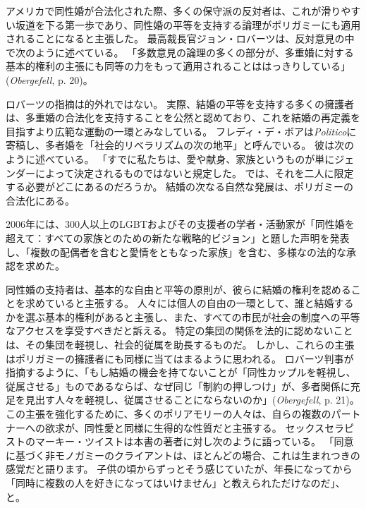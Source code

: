 \documentclass[paper=a4,book,openany]{jlreq}
\newcommand{\ig}[1]{}           %
\begin{document}
アメリカで同性婚が合法化された際、多くの保守派の反対者は、これが滑りやすい坂道を下る第一歩であり、同性婚の平等を支持する論理がポリガミーにも適用されることになると主張した。
最高裁長官ジョン・ロバーツ\ig{John Roberts}は、反対意見の中で次のように述べている。
「多数意見の論理の多くの部分が、多重婚に対する基本的権利の主張にも同等の力をもって適用されることははっきりしている」(\emph{Obergefell}, p. 20)。

ロバーツ\ig{John Roberts}の指摘は的外れではない。
実際、結婚の平等を支持する多くの擁護者は、多重婚の合法化を支持することを公然と認めており、これを結婚の再定義を目指すより広範な運動の一環とみなしている。
フレディ・デ・ボアは\emph{Politico}に寄稿し、多者婚を「社会的リベラリズムの次の地平」と呼んでいる。
彼は次のように述べている。
「すでに私たちは、愛や献身、家族というものが単にジェンダーによって決定されるものではないと規定した。
では、それを二人に限定する必要がどこにあるのだろうか。
結婚の次なる自然な発展は、ポリガミーの合法化にある\citep{deboer15:_it_time_legal_polyg}。

2006年には、300人以上のLGBTおよびその支援者の学者・活動家が「同性婚を超えて：すべての家族とのための新たな戦略的ビジョン」と題した声明を発表し、「複数の配偶者を含むと愛情をともなった家族」を含む、多様なの法的な承認を求めた\citep{MR06:_beyon_same_sex_marriag}。

同性婚の支持者は、基本的な自由と平等の原則が、彼らに結婚の権利を認めることを求めていると主張する。
人々には個人の自由の一環として、誰と結婚するかを選ぶ基本的権利があると主張し、また、すべての市民が社会の制度への平等なアクセスを享受すべきだと訴える。
特定の集団の関係を法的に認めないことは、その集団を軽視し、社会的従属を助長するものだ。
しかし、これらの主張はポリガミーの擁護者にも同様に当てはまるように思われる。
ロバーツ判事\ig{John Roberts}が指摘するように、「もし結婚の機会を持てないことが「同性カップルを軽視し、従属させる」ものであるならば、なぜ同じ「制約の押しつけ」が、多者関係に充足を見出す人々を軽視し、従属させることにならないのか」(\emph{Obergefell}, p. 21)。
この主張を強化するために、多くのポリアモリーの人々は、自らの複数のパートナーへの欲求が、同性愛と同様に生得的な性質だと主張する。
セックスセラピストのマーキー・ツイストは本書の著者に対し次のように語っている。
「同意に基づく非モノガミーのクライアントは、ほとんどの場合、これは生まれつきの感覚だと語ります。
子供の頃からずっとそう感じていたが、年長になってから「同時に複数の人を好きになってはいけません」と教えられただけなのだ」、と\citep{mcarthur16:_why_peopl_are_fight_get}。
\end{document}
